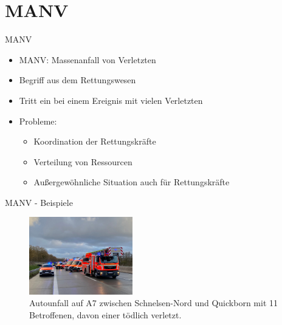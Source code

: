 
\section{MANV}

\begin{frame}{MANV}
	\begin{itemize}
		\item MANV: \alert{Massenanfall von Verletzten}
		\item Begriff aus dem Rettungswesen
		\item Tritt ein bei einem Ereignis mit vielen Verletzten
		\item Probleme:
		      \begin{itemize}
			      \item Koordination der Rettungskräfte
			      \item Verteilung von Ressourcen
			      \item Außergewöhnliche Situation auch für Rettungskräfte
		      \end{itemize}
	\end{itemize}
\end{frame}

\begin{frame}{MANV - Beispiele}
	\begin{examples}
		\begin{figure}
			\begin{center}
				\includegraphics[width=0.4\textwidth]{images/autounfall.jpg}
			\end{center}
			\caption{Autounfall auf A7 zwischen Schnelsen-Nord und Quickborn mit 11 Betroffenen, davon einer tödlich verletzt.\cite{manv-a7}}\label{fig:autounfall}
		\end{figure}
	\end{examples}
\end{frame}

